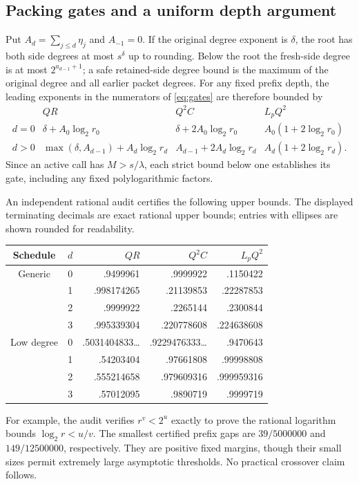\subsection{Packing gates and a uniform depth argument}

Put $A_d=\sum_{j\le d}\eta_j$ and $A_{-1}=0$. If the original degree
exponent is $\delta$, the root has both side degrees at most
$s^\delta$ up to rounding. Below the root the fresh-side degree is at
most $2^{a_{d-1}+1}$; a safe retained-side degree bound is the maximum
of the original degree and all earlier packet degrees. For any fixed
prefix depth, the leading exponents in the numerators of
\eqref{eq:gates} are therefore bounded by
\[
\begin{array}{c|ccc}
 & QR & Q^2C & L_pQ^2\\\hline
 d=0 & \delta+A_0\log_2r_0
       &\delta+2A_0\log_2r_0&A_0(1+2\log_2r_0)\\
 d>0 & \max(\delta,A_{d-1})+A_d\log_2r_d
       &A_{d-1}+2A_d\log_2r_d&A_d(1+2\log_2r_d).
\end{array}
\]
Since an active call has $M>s/\lambda$, each strict bound below one
establishes its gate, including any fixed polylogarithmic factors.

An independent rational audit certifies the following upper bounds. The
displayed terminating decimals are exact rational upper bounds; entries
with ellipses are shown rounded for readability.

\begin{center}\small
\begin{tabular}{@{}ccrrr@{}}
\toprule Schedule & $d$ & $QR$ & $Q^2C$ & $L_pQ^2$\\\midrule
Generic &0& .9499961&.9999922&.1150422\\
 &1&.998174265&.21139853&.22287853\\
 &2&.9999922&.2265144&.2300844\\
 &3&.995339304&.220778608&.224638608\\\midrule
Low degree &0&.5031404833\ldots&.9229476333\ldots&.9470643\\
 &1&.54203404&.97661808&.99998808\\
 &2&.555214658&.979609316&.999959316\\
 &3&.57012095&.9890719&.9999719\\
\bottomrule
\end{tabular}
\end{center}

For example, the audit verifies $r^v<2^u$ exactly to prove the rational
logarithm bounds $\log_2r<u/v$. The smallest certified prefix gaps are
$39/5000000$ and $149/12500000$, respectively. They are positive fixed
margins, though their small sizes permit extremely large asymptotic
thresholds. No practical crossover claim follows.

